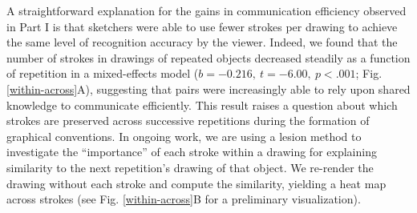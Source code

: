 \documentclass[10pt,letterpaper]{article}
\newcommand{\jefan}[1]{\textcolor{Blue}{jefan: #1}}
\begin{document}
A straightforward explanation for the gains in communication efficiency observed in Part I is that sketchers were able to use fewer strokes per drawing to achieve the same level of recognition accuracy by the viewer.
Indeed, we found that the number of strokes in drawings of repeated objects decreased steadily as a function of repetition in a mixed-effects model ($b = -0.216, ~t = -6.00, ~p < .001$; Fig. \ref{within-across}A), %
suggesting that pairs were increasingly able to rely upon shared knowledge to communicate efficiently.
This result raises a question about which strokes are preserved across successive repetitions during the formation of graphical conventions.
In ongoing work, we are using a lesion method to investigate the ``importance'' of each stroke within a drawing for explaining similarity to the next repetition's drawing of that object.
We re-render the drawing without each stroke and compute the similarity, yielding a heat map across strokes (see Fig. \ref{within-across}B for a preliminary visualization).





\end{document}
